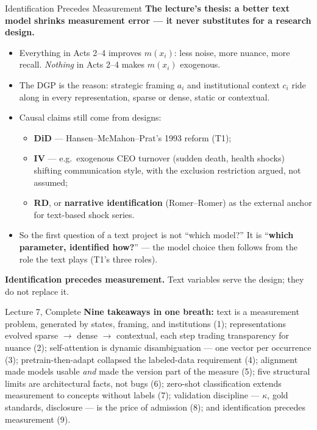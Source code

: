 \begin{frame}{Identification Precedes Measurement}
\textbf{The lecture's thesis: a better text model shrinks measurement error --- it never substitutes for a research design.}
\begin{itemize}
\item Everything in Acts 2--4 improves $m(x_i)$: less noise, more nuance, more recall. \emph{Nothing} in Acts 2--4 makes $m(x_i)$ exogenous.
\item The DGP is the reason: strategic framing $a_i$ and institutional context $c_i$ ride along in every representation, sparse or dense, static or contextual.
\item Causal claims still come from designs:
\begin{itemize}
    \item \textbf{DiD} --- Hansen--McMahon--Prat's 1993 reform (T1);
    \item \textbf{IV} --- e.g.\ exogenous CEO turnover (sudden death, health shocks) shifting communication style, with the exclusion restriction argued, not assumed;
    \item \textbf{RD}, or \textbf{narrative identification} (Romer--Romer) as the external anchor for text-based shock series.
\end{itemize}
\item So the first question of a text project is not ``which model?'' It is ``\textbf{which parameter, identified how?}'' --- the model choice then follows from the role the text plays (T1's three roles).
\end{itemize}
\medskip
\begin{takeawaybox}
\textbf{Identification precedes measurement.} Text variables serve the design; they do not replace it.
\end{takeawaybox}
\end{frame}

\begin{frame}{Lecture 7, Complete}
\smallskip
{\footnotesize \textbf{Nine takeaways in one breath:} text is a measurement problem, generated by states, framing, and institutions (1); representations evolved sparse $\to$ dense $\to$ contextual, each step trading transparency for nuance (2); self-attention is dynamic disambiguation --- one vector per occurrence (3); pretrain-then-adapt collapsed the labeled-data requirement (4); alignment made models usable \emph{and} made the version part of the measure (5); five structural limits are architectural facts, not bugs (6); zero-shot classification extends measurement to concepts without labels (7); validation discipline --- $\kappa$, gold standards, disclosure --- is the price of admission (8); and identification precedes measurement (9).}
\end{frame}

